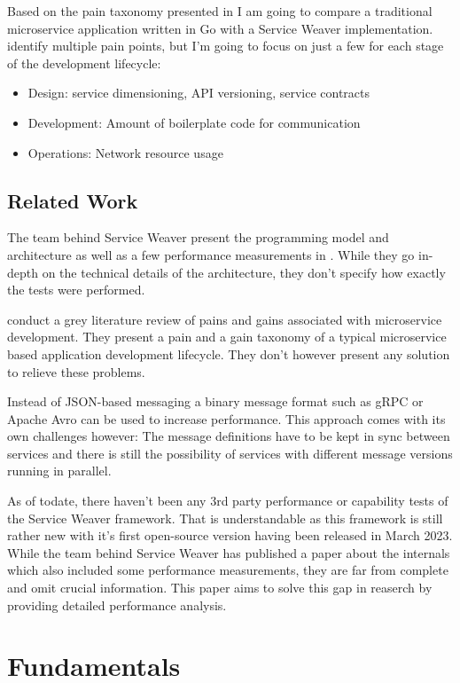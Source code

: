 \documentclass[sigconf,review,9pt]{acmart}
\begin{document}
Based on the pain taxonomy presented in \cite{soldani_pains_gains} I am going to
compare a traditional microservice application written in Go with a Service Weaver
implementation.
 identify multiple pain points, but I'm going to focus
on just a few for each stage of the development lifecycle:
\begin{itemize}
	\item{Design: service dimensioning, API versioning, service contracts}
	\item{Development: Amount of boilerplate code for communication}
	\item{Operations: Network resource usage}
\end{itemize}

\subsection{Related Work}
The team behind Service Weaver present the programming model and architecture
as well as a few performance measurements in \cite{service_weaver_paper}.
While they go in-depth on the technical details of the architecture, they don't
specify how exactly the tests were performed.

 conduct a grey literature review of pains and gains
associated with microservice development.
They present a pain and a gain taxonomy of a typical microservice based application
development lifecycle.
They don't however present any solution to relieve these problems.

Instead of JSON-based messaging a binary message format such as gRPC \cite{GRPC}
or Apache Avro \cite{ApacheAvro} can be used to increase performance.
This approach comes with its own challenges however: The message definitions have
to be kept in sync between services and there is still the possibility of services
with different message versions running in parallel.

As of todate, there haven't been any 3rd party performance or capability tests
of the Service Weaver framework.
That is understandable as this framework is still rather new with it's first
open-source version having been released in March 2023.
While the team behind Service Weaver has published a paper about the internals
which also included some performance measurements, they are far from complete
and omit crucial information.
This paper aims to solve this gap in reaserch by providing detailed performance
analysis.

\section{Fundamentals}
\end{document}
